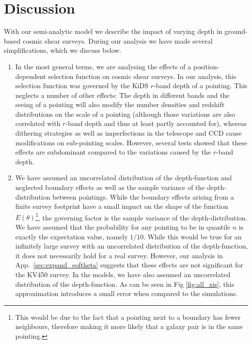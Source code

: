 \documentclass{aa}
\begin{document}
\section{Discussion}
\label{sec:discussion}
With our semi-analytic model we describe the impact of varying depth in ground-based cosmic shear surveys. During our analysis we have made several simplifications, which we discuss below.
\begin{enumerate}
\item In the most general terms, we are analysing the effects of a position-dependent selection function on cosmic shear surveys. In our analysis, this selection function was governed by the KiDS $r$-band depth of a pointing. This neglects a number of other effects: The depth in different bands and the seeing of a pointing will also modify the number densities and redshift distributions on the scale of a pointing (although those variations are also correlated with $r$-band depth and thus at least partly accounted for), whereas dithering strategies as well as imperfections in the telescope and CCD cause modifications on sub-pointing scales. However, several tests showed that these effects are subdominant compared to the variations caused by the $r$-band depth.

\item We have assumed an uncorrelated distribution of the depth-function and neglected boundary effects as well as the sample variance of the depth-distribution between pointings. While the boundary effects arising from a finite survey footprint have a small impact on the shape of the function $E(\theta)$\footnote{This would be due to the fact that a pointing next to a boundary has fewer neighbours, therefore making it more likely that a galaxy pair is in the same pointing.}, the governing factor is the sample variance of the depth-distribution. We have assumed that the probability for any pointing to be in quantile $n$ is exactly the expectation value, namely $1/10$. While this would be true for an infinitely large survey with an uncorrelated distribution of the depth-function, it does not necessarily hold for a real survey. However, our analysis in App.~\ref{sec:expand_eoftheta} suggests that these effects are not significant for the KV450 survey. In the models, we have also assumed an uncorrelated distribution of the depth-function. As can be seen in Fig \ref{fig:all_xis}, this approximation introduces a small error when compared to the simulations.


\end{enumerate}
\end{document}
